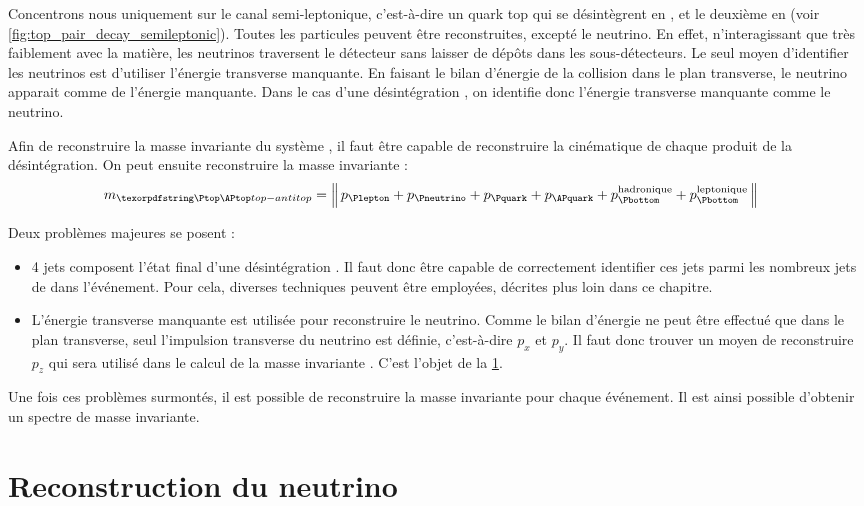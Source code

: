 Concentrons nous uniquement sur le canal semi-leptonique, c'est-à-dire un quark top qui se désintègrent en \Plepton{}\Pneutrino{}\Pbottom, et le deuxième en \Pbottom{}\Pquark{}\APquark (voir \cref{fig:top_pair_decay_semileptonic}). Toutes les particules peuvent être reconstruites, excepté le neutrino. En effet, n'interagissant que très faiblement avec la matière, les neutrinos traversent le détecteur sans laisser de dépôts dans les sous-détecteurs. Le seul moyen d'identifier les neutrinos est d'utiliser l'énergie transverse manquante. En faisant le bilan d'énergie de la collision dans le plan transverse, le neutrino apparait comme de l'énergie manquante. Dans le cas d'une désintégration \ttbar, on identifie donc l'énergie transverse manquante comme le neutrino.

Afin de reconstruire la masse invariante du système \ttbar, il faut être capable de reconstruire la cinématique de chaque produit de la désintégration. On peut ensuite reconstruire la masse invariante \ttbar :
\begin{align} \label{eq:invariant_mass_tt}
  m_{\ttbar} &= \norm{ p_{\Plepton} + p_{\Pneutrino} + p_{\Pquark} + p_{\APquark} + p_{\Pbottom}^{\text{hadronique}} + p_{\Pbottom}^\text{leptonique} }
\end{align}

Deux problèmes majeures se posent :
\begin{itemize}
    \item 4 jets composent l'état final d'une désintégration \ttbar. Il faut donc être capable de correctement identifier ces jets parmi les nombreux jets de \pu dans l'événement. Pour cela, diverses techniques peuvent être employées, décrites plus loin dans ce chapitre.
    \item L'énergie transverse manquante est utilisée pour reconstruire le neutrino. Comme le bilan d'énergie ne peut être effectué que dans le plan transverse, seul l'impulsion transverse du neutrino est définie, c'est-à-dire $p_x$ et $p_y$. Il faut donc trouver un moyen de reconstruire $p_z$ qui sera utilisé dans le calcul de la masse invariante \ttbar. C'est l'objet de la \cref{sec:neutrino}.
\end{itemize}

Une fois ces problèmes surmontés, il est possible de reconstruire la masse invariante pour chaque événement. Il est ainsi possible d'obtenir un spectre de masse invariante.

\section{Reconstruction du neutrino} \label{sec:neutrino}

